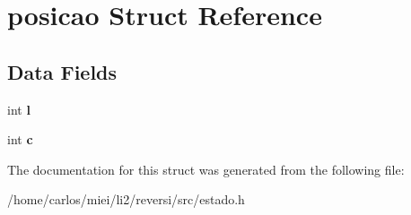 \hypertarget{structposicao}{}\section{posicao Struct Reference}
\label{structposicao}
\subsection*{Data Fields}
\begin{DoxyCompactItemize}
\item 
\mbox{\label{structposicao_a89606eca6b563ec68d2da2e84657736f}} 
int {\bfseries l}
\item 
\mbox{\label{structposicao_a4e1e0e72dd773439e333c84dd762a9c3}} 
int {\bfseries c}
\end{DoxyCompactItemize}


The documentation for this struct was generated from the following file\+:\begin{DoxyCompactItemize}
\item 
/home/carlos/miei/li2/reversi/src/estado.\+h\end{DoxyCompactItemize}
